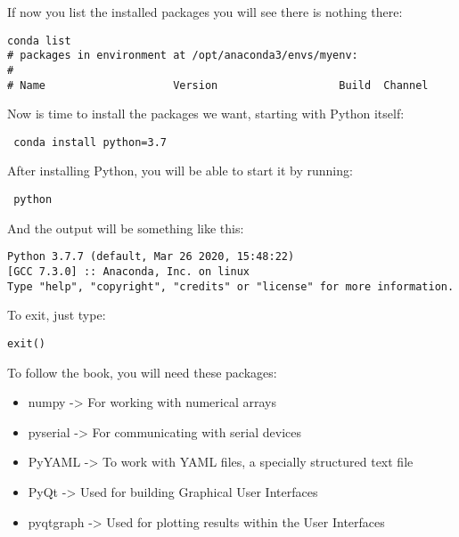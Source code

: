If now you list the installed packages you will see there is nothing there:

\begin{verbatim}
conda list
# packages in environment at /opt/anaconda3/envs/myenv:
#
# Name                    Version                   Build  Channel
\end{verbatim}

Now is time to install the packages we want, starting with Python itself:

\begin{verbatim}
 conda install python=3.7
\end{verbatim}


After installing Python, you will be able to start it by running:

\begin{verbatim}
 python
\end{verbatim}

And the output will be something like this:

\begin{verbatim}
Python 3.7.7 (default, Mar 26 2020, 15:48:22) 
[GCC 7.3.0] :: Anaconda, Inc. on linux
Type "help", "copyright", "credits" or "license" for more information.
\end{verbatim}

To exit, just type:

\begin{verbatim}
exit()
\end{verbatim}

To follow the book, you will need these packages:

\begin{itemize}
 \item numpy -> For working with numerical arrays
 \item pyserial -> For communicating with serial devices
 \item PyYAML -> To work with YAML files, a specially structured text file
 \item PyQt -> Used for building Graphical User Interfaces
 \item pyqtgraph -> Used for plotting results within the User Interfaces
\end{itemize}

